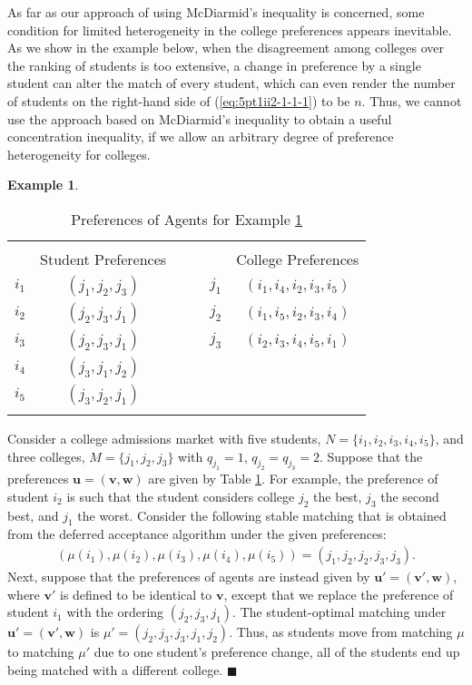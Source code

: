 \documentclass[12pt, fullpage]{amsart}
\theoremstyle{definition}
\theoremstyle{definition}
\theoremstyle{definition}
\newtheorem{example}{Example}[section]
\begin{document}
\begin{bibunit}[econometrica]
As far as our approach of using McDiarmid’s inequality is concerned, some condition for limited heterogeneity in the college preferences appears inevitable. As we show in the example below, when the disagreement among colleges over the ranking of students is too extensive, a change in preference by a single student can alter the match of every student, which can even render the number of students on the right-hand side of (\ref{eq:5pt1ii2-1-1-1}) to be $n$. Thus, we cannot use the approach based on McDiarmid's inequality to obtain a useful concentration inequality, if we allow an arbitrary degree of preference heterogeneity for colleges.

\begin{example}\label{ex:1} 
	\begin{table}	
		\centering{}\caption{Preferences of Agents for Example \ref{ex:1} }
		\label{example_1}%
		\begin{tabular}{cccccc}
			&  &  &  &  & \tabularnewline
			& Student Preferences &  &  &  & College Preferences \tabularnewline
			$i_{1}$ & $(j_{1},j_{2},j_{3})$ &  &  & $j_{1}$ & $(i_{1},i_{4},i_{2},i_{3},i_{5})$\tabularnewline
			$i_{2}$ & $(j_{2},j_{3},j_{1})$ &  &  & $j_{2}$ & $(i_{1},i_{5},i_{2},i_{3},i_{4})$\tabularnewline
			$i_{3}$ & $(j_{2},j_{3},j_{1})$ &  &  & $j_{3}$ & $(i_{2},i_{3},i_{4},i_{5},i_{1})$\tabularnewline
			$i_{4}$ & $(j_{3},j_{1},j_{2})$ &  &  &  & \tabularnewline
			$i_{5}$ & $(j_{3},j_{2},j_{1})$ &  &  &  & \tabularnewline
			&  &  &  &  & \tabularnewline
		\end{tabular}
	\bigskip
	\end{table}
	Consider a college admissions market with five students, $N=\{i_{1},i_{2},i_{3},i_{4},i_{5}\}$,
	and three colleges, $M=\{j_{1},j_{2},j_{3}\}$ with $q_{j_1}=1$, $q_{j_2}=q_{j_3}=2$.
	Suppose that the preferences $\boldsymbol{u}=(\boldsymbol{v},\boldsymbol{w})$
	are given by Table \ref{example_1}. For example, the preference of student $i_2$ is such that the student considers college $j_2$ the best, $j_{3}$ the second best, and $j_{1}$ the worst. Consider the following stable matching that is obtained from the deferred acceptance algorithm under the given preferences:
	\begin{align*}
		(\mu(i_1),\mu(i_2),\mu(i_3),\mu(i_4),\mu(i_5)) = (j_{1},j_{2},j_{2},j_{3},j_{3}).
	\end{align*}
	Next, suppose that the preferences of agents are instead given by $\boldsymbol{u}'=(\boldsymbol{v}',\boldsymbol{w})$, where $\boldsymbol{v}'$ is defined to be identical
	to $\boldsymbol{v}$, except that we replace the preference of student
	$i_{1}$ with the ordering $(j_{2},j_{3},j_{1})$. The student-optimal matching
	under $\boldsymbol{u}'=(\boldsymbol{v}',\boldsymbol{w})$ is $\mu'=(j_{2},j_{3},j_{3},j_{1},j_{2})$. Thus, as students move from matching $\mu$ to matching $\mu'$ due to one student's preference change, all of the students end up being matched with a different college. $\blacksquare$
\end{example}



\end{bibunit}
\end{document}

